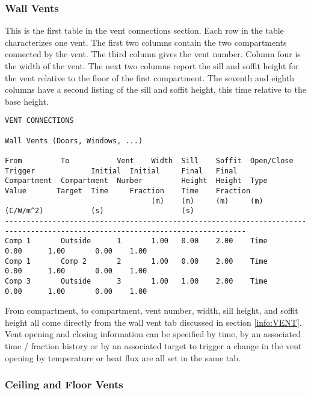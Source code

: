 \subsubsection{Wall Vents}
This is the first table in the vent connections section.  Each row in the table characterizes one vent.  The first two columns contain the two compartments connected by the vent. The third column gives the vent number.  Column four is the width of the vent.  The next two columns report the sill and soffit height for the vent relative to the floor of the first compartment.  The seventh and eighth columns have a second listing of the sill and soffit height, this time relative to the base height.

\begin{lstlisting}[basicstyle=\tiny]
VENT CONNECTIONS

Wall Vents (Doors, Windows, ...)

From         To           Vent    Width  Sill    Soffit  Open/Close  Trigger             Initial  Initial     Final   Final
Compartment  Compartment  Number         Height  Height  Type        Value       Target  Time     Fraction    Time    Fraction
                                  (m)    (m)     (m)     (m)         (C/W/m^2)           (s)                  (s)
------------------------------------------------------------------------------------------------------------------------------
Comp 1       Outside      1       1.00   0.00    2.00    Time                            0.00      1.00       0.00    1.00
Comp 1       Comp 2       2       1.00   0.00    2.00    Time                            0.00      1.00       0.00    1.00
Comp 3       Outside      3       1.00   1.00    2.00    Time                            0.00      1.00       0.00    1.00
\end{lstlisting}
From compartment, to compartment, vent number, width, sill height, and soffit height all come directly from the wall vent tab discussed in section \ref{info:VENT}. Vent opening and closing information can be specified by time, by an associated time / fraction history or by an associated target to trigger a change in the vent opening by temperature or heat flux are all set in the same tab.

\subsubsection{Ceiling and Floor Vents}

